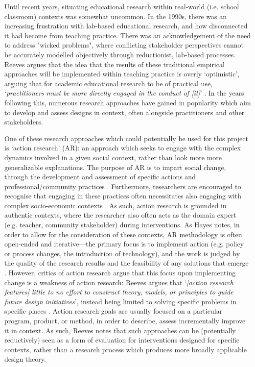 Until recent years, situating educational research within real-world (i.e. school classroom) contexts was somewhat uncommon. In the 1990s, there was an increasing frustration with lab-based educational research, and how disconnected it had become from teaching practice. There was an acknowledgement of the need to address "wicked problems", where conflicting stakeholder perspectives cannot be accurately modelled objectively through reductionist, lab-based processes. Reeves argues that the idea that the results of these traditional empirical approaches will be implemented within teaching practice is overly `optimistic', arguing that for academic educational research to be of practical use, `\textit{practitioners must be more directly engaged in the conduct of [it]}' \citep{reeves2000}. In the years following this, numerous research approaches have gained in popularity which aim to develop and assess designs in context, often alongside practitioners and other stakeholders. 

One of these research approaches which could potentially be used for this project is `action research' (AR): an approach which seeks to engage with the complex dynamics involved in a given social context, rather than look more more generalizable explanations. The purpose of AR is to impart social change, through the development and assessment of specific actions and professional/community practices \citep{macdonald2012}. Furthermore, researchers are encouraged to recognise that engaging in these practices often necessitates also engaging with complex socio-economic contexts \citep{stringer2013}. As such, action research is grounded in authentic contexts, where the researcher also often acts as the domain expert (e.g. teacher, community stakeholder) during interventions. As Hayes notes, in order to allow for the consideration of these contexts, AR methodology is often open-ended and iterative---the primary focus is to implement action (e.g. policy or process changes, the introduction of technology), and the work is judged by the quality of the research results and the feasibility of any solutions that emerge \citep{hayes2011}. However, critics of action research argue that this focus upon implementing change is a weakness of action research: Reeves argues that `\textit{[action research features] little to no effort to construct theory, models, or principles to guide future design initiatives}', instead being limited to solving specific problems in specific places \citep{reeves2000}. Action research goals are usually focused on a particular program, product, or method, in order to describe, assess incrementally improve it in context. As such, Reeves notes that such approaches can be (potentially reductively) seen as a form of evaluation for interventions designed for specific contexts, rather than a research process which produces more broadly applicable design theory.

